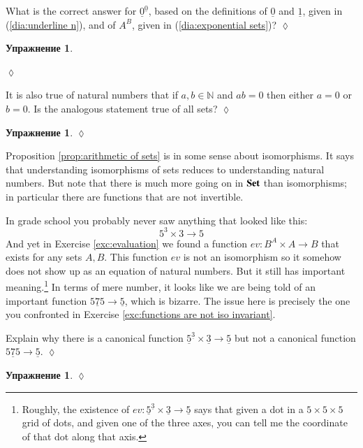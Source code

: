 \documentclass[a4paper]{book}
\def\NN{{\mathbb N}}
\def\to{\rightarrow}
\def\taking{\colon}
\def\too{\longrightarrow}
\def\ul{\underline}
\def\Set{{\bf Set}}
\theoremstyle{myth}
\newtheorem{excENG}[envENG]{\begin{english}Exercise\end{english}}
\newenvironment{exerciseENG}{\begin{excENG}}{\hspace*{\fill}$\lozenge$\end{excENG}}
\newtheorem{excRUS}[envRUS]{Упражнение}
\newenvironment{exerciseRUS}{\begin{excRUS}}{\hspace*{\fill}$\lozenge$\end{excRUS}}
\begin{document}
\begin{russian}
\begin{exerciseENG}
What is the correct answer for $\ul{0}^{\ul{0}}$, based on the definitions of $\ul{0}$ and $\ul{1}$, given in (\ref{dia:underline n}), and of $A^B$, given in (\ref{dia:exponential sets})?
\end{exerciseENG}

\begin{exerciseRUS}\label{exc:0 to the 0}
 
\end{exerciseRUS}

\begin{exerciseENG}
It is also true of natural numbers that if $a,b\in\NN$ and $ab=0$ then either $a=0$ or $b=0$. Is the analogous statement true of all sets?
\end{exerciseENG}

\begin{exerciseRUS}
 
\end{exerciseRUS}

Proposition \ref{prop:arithmetic of sets} is in some sense about isomorphisms. It says that understanding isomorphisms of sets reduces to understanding natural numbers. But note that there is much more going on in $\Set$ than isomorphisms; in particular there are functions that are not invertible. 

 

In grade school you probably never saw anything that looked like this:
$$5^3\times 3\too 5$$
And yet in Exercise \ref{exc:evaluation} we found a function $ev\taking B^A\times A\to B$ that exists for any sets $A,B$. This function $ev$ is not an isomorphism so it somehow does not show up as an equation of natural numbers. But it still has important meaning.\footnote{Roughly, the existence of $ev\taking\ul{5}^{\ul{3}}\times\ul{3}\too \ul{5}$ says that given a dot in a $5\times 5\times 5$ grid of dots, and given one of the three axes, you can tell me the coordinate of that dot along that axis.} In terms of mere number, it looks like we are being told of an important function $\ul{575}\to\ul{5}$, which is bizarre. The issue here is precisely the one you confronted in Exercise \ref{exc:functions are not iso invariant}.

 

\begin{exerciseENG}
Explain why there is a canonical function $\ul{5}^{\ul{3}}\times\ul{3}\too \ul{5}$ but not a canonical function $\ul{575}\to\ul{5}$.
\end{exerciseENG}

\begin{exerciseRUS}
 

\end{exerciseRUS}
\end{russian}
\end{document}
